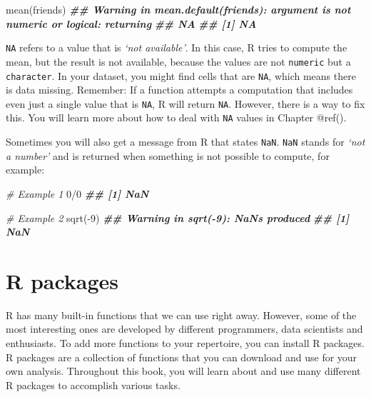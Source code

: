 \documentclass[
]{book}
\newenvironment{Shaded}{\begin{snugshade}}{\end{snugshade}}
\newcommand{\CommentTok}[1]{\textcolor[rgb]{0.56,0.35,0.01}{\textit{#1}}}
\newcommand{\DecValTok}[1]{\textcolor[rgb]{0.00,0.00,0.81}{#1}}
\newcommand{\DocumentationTok}[1]{\textcolor[rgb]{0.56,0.35,0.01}{\textbf{\textit{#1}}}}
\newcommand{\FunctionTok}[1]{\textcolor[rgb]{0.00,0.00,0.00}{#1}}
\newcommand{\NormalTok}[1]{#1}
\newcommand{\SpecialCharTok}[1]{\textcolor[rgb]{0.00,0.00,0.00}{#1}}
\begin{document}
\begin{Shaded}
\begin{Highlighting}[]
\FunctionTok{mean}\NormalTok{(friends)}
\DocumentationTok{\#\# Warning in mean.default(friends): argument is not numeric or logical: returning}
\DocumentationTok{\#\# NA}
\DocumentationTok{\#\# [1] NA}
\end{Highlighting}
\end{Shaded}

\texttt{NA} refers to a value that is \emph{`not available'}. In this case, R tries to compute the mean, but the result is not available, because the values are not \texttt{numeric} but a \texttt{character}. In your dataset, you might find cells that are \texttt{NA}, which means there is data missing. Remember: If a function attempts a computation that includes even just a single value that is \texttt{NA}, R will return \texttt{NA}. However, there is a way to fix this. You will learn more about how to deal with \texttt{NA} values in Chapter @ref().

Sometimes you will also get a message from R that states \texttt{NaN}. \texttt{NaN} stands for \emph{`not a number'} and is returned when something is not possible to compute, for example:

\begin{Shaded}
\begin{Highlighting}[]
\CommentTok{\# Example 1}
\DecValTok{0}\SpecialCharTok{/}\DecValTok{0}
\DocumentationTok{\#\# [1] NaN}

\CommentTok{\# Example 2}
\FunctionTok{sqrt}\NormalTok{(}\SpecialCharTok{{-}}\DecValTok{9}\NormalTok{)}
\DocumentationTok{\#\# Warning in sqrt({-}9): NaNs produced}
\DocumentationTok{\#\# [1] NaN}
\end{Highlighting}
\end{Shaded}

\hypertarget{r-packages}{%
\section{R packages}\label{r-packages}}

R has many built-in functions that we can use right away. However, some of the most interesting ones are developed by different programmers, data scientists and enthusiasts. To add more functions to your repertoire, you can install R packages. R packages are a collection of functions that you can download and use for your own analysis. Throughout this book, you will learn about and use many different R packages to accomplish various tasks.
\end{document}
